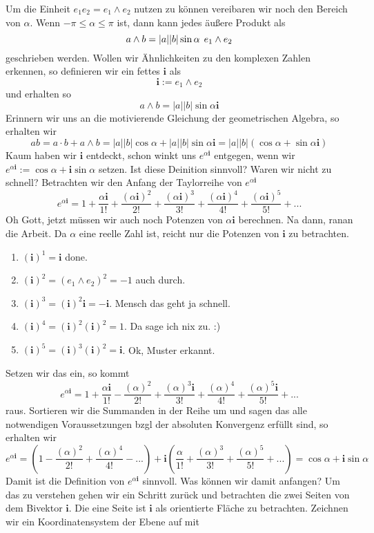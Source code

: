 \documentclass[fleqn]{scrartcl}
\numberwithin{equation}{section}
\def\*#1{\mathbf{#1}}
\begin{document}
Um die Einheit $e_1e_2 = e_1\wedge e_2$ nutzen zu können vereibaren wir noch
den Bereich von $\alpha$. Wenn $-\pi\leq\alpha\leq\pi$ ist, dann kann jedes
äußere Produkt als
\[a\wedge b= |a||b|\sin\alpha \hspace{1ex} e_1\wedge e_2\]
geschrieben werden. Wollen wir Ähnlichkeiten zu den komplexen Zahlen erkennen,
so definieren wir ein fettes $\*i$ als
\[\*i:= e_1\wedge e_2\]
und erhalten so
\[a\wedge b= |a||b|\sin\alpha\*i\]
Erinnern wir uns an die motivierende Gleichung der geometrischen Algebra, so
erhalten wir
\[ab=a\cdot b + a\wedge b = |a||b|\cos\alpha + |a||b|\sin\alpha\*i =
|a||b|(\cos\alpha + \sin\alpha\*i)\]
Kaum haben wir $\*i$ entdeckt, schon winkt uns $e^{\alpha\*i}$ entgegen, wenn
wir $e^{\alpha\*i} := \cos\alpha + \*i\sin\alpha$ setzen. Ist diese Deinition
sinnvoll? Waren wir nicht zu schnell? Betrachten wir den Anfang der
Taylorreihe von $e^{\alpha\*i}$
\[e^{\alpha\*i}=1+\frac{\alpha\*i}{1!}+\frac{(\alpha\*i)^2}{2!}
+\frac{(\alpha\*i)^3}{3!}+\frac{(\alpha\*i)^4}{4!}+\frac{(\alpha\*i)^5}{5!}+ ...\]
Oh Gott, jetzt müssen wir auch noch Potenzen von $\alpha\*i$ berechnen. Na
dann, ranan die Arbeit. Da $\alpha$ eine reelle Zahl ist, reicht nur die
Potenzen von $\*i$ zu betrachten.
\begin{enumerate}
    \item $(\*i)^1=\*i$ done.
    \item $(\*i)^2=(e_1\wedge e_2)^2=-1$ auch durch.
    \item $(\*i)^3 = (\*i)^2\*i = -\*i$. Mensch das geht ja schnell.
    \item $(\*i)^4=(\*i)^2(\*i)^2=1$. Da sage ich nix zu. :)
    \item $(\*i)^5=(\*i)^3(\*i)^2=\*i$. Ok, Muster erkannt.
\end{enumerate}
Setzen wir das ein, so kommt
\[e^{\alpha\*i}=1+\frac{\alpha\*i}{1!}-\frac{(\alpha)^2}{2!}
+\frac{(\alpha)^3\*i}{3!}+\frac{(\alpha)^4}{4!}+\frac{(\alpha)^5\*i}{5!}+ ...\]
raus. Sortieren wir die Summanden in der Reihe um und sagen das alle
notwendigen Voraussetzungen bzgl der absoluten Konvergenz erfüllt sind, so
erhalten wir
\[e^{\alpha\*i}=\left(1-\frac{(\alpha)^2}{2!}+\frac{(\alpha)^4}{4!}-...\right)
+\*i\left(\frac{\alpha}{1!}+\frac{(\alpha)^3}{3!}+\frac{(\alpha)^5}{5!}+
...\right)=\cos\alpha+\*i\sin\alpha\]
Damit ist die Definition von $e^{\alpha\*i}$ sinnvoll. Was können wir damit
anfangen? Um das zu verstehen gehen wir ein Schritt zurück und betrachten die
zwei Seiten von dem Bivektor $\*i$. Die eine Seite ist $\*i$ als orientierte
Fläche zu betrachten. Zeichnen wir ein Koordinatensystem der Ebene auf mit
\end{document}
